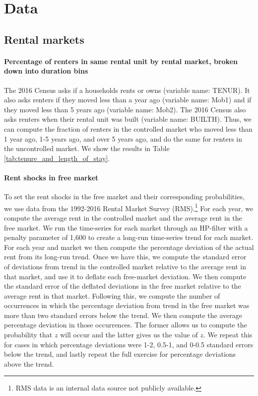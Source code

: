 \documentclass[parskip=full]{article}
\begin{document}
\section{Data}\label{appendix:data}

\subsection{Rental markets}

\paragraph{Percentage of renters in same rental unit by rental market, broken down into duration bins}

The 2016 Census asks if a households rents or owns (variable name: TENUR). It also asks renters if they moved less than a year ago (variable name: Mob1) and if they moved less than 5 years ago (variable name: Mob2). The 2016 Census also asks renters when their rental unit was built (variable name: BUILTH). Thus, we can compute the fraction of renters in the controlled market who moved less than 1 year ago, 1-5 years ago, and over 5 years ago, and do the same for renters in the uncontrolled market. We show the results in Table \ref{tab:tenure_and_length_of_stay}.

\paragraph{Rent shocks in free market}

To set the rent shocks in the free market and their corresponding probabilities, we use data from the 1992-2016 Rental Market Survey (RMS).\footnote{RMS data is an internal data source not publicly available.} For each year, we compute the average rent in the controlled market and the average rent in the free market. We run the time-series for each market through an HP-filter with a penalty parameter of 1,600 to create a long-run time-series trend for each market. For each year and market we then compute the percentage deviation of the actual rent from its long-run trend. Once we have this, we compute the standard error of deviations from trend in the controlled market relative to the average rent in that market, and use it to deflate each free-market deviation. We then compute the standard error of the deflated deviations in the free market relative to the average rent in that market. Following this, we compute the number of occurrences in which the percentage deviation from trend in the free market was more than two standard errors below the trend. We then compute the average percentage deviation in those occurrences. The former allows us to compute the probability that $z$ will occur and the latter gives us the value of $z$. We repeat this for cases in which percentage deviations were 1-2, 0.5-1, and 0-0.5 standard errors below the trend, and lastly repeat the full exercise for percentage deviations above the trend.
\end{document}
